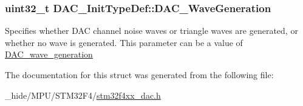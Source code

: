 \subsubsection[{D\+A\+C\+\_\+\+Wave\+Generation}]{\setlength{\rightskip}{0pt plus 5cm}uint32\+\_\+t D\+A\+C\+\_\+\+Init\+Type\+Def\+::\+D\+A\+C\+\_\+\+Wave\+Generation}\label{struct_d_a_c___init_type_def_a6753e78ddd2dc8273444ba01a272d63a}
Specifies whether D\+A\+C channel noise waves or triangle waves are generated, or whether no wave is generated. This parameter can be a value of \hyperlink{group___d_a_c__wave__generation}{D\+A\+C\+\_\+wave\+\_\+generation} 

The documentation for this struct was generated from the following file\+:\begin{DoxyCompactItemize}
\item 
\+\_\+hide/\+M\+P\+U/\+S\+T\+M32\+F4/\hyperlink{stm32f4xx__dac_8h}{stm32f4xx\+\_\+dac.\+h}\end{DoxyCompactItemize}
